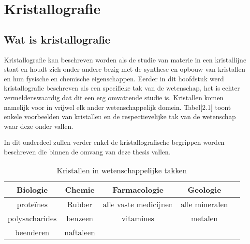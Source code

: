\section{Kristallografie}

\subsection{Wat is kristallografie}
Kristallografie kan beschreven worden als de studie van materie in een kristallijne staat en houdt zich onder andere bezig met de synthese en opbouw van kristallen en hun fysische en chemische eigenschappen. Eerder in dit hoofdstuk werd kristallografie beschreven als een specifieke tak van de wetenschap, het is echter vermeldenswaardig dat dit een erg omvattende studie is. Kristallen komen namelijk voor in vrijwel elk ander wetenschappelijk domein. Tabel[2.1] toont enkele voorbeelden van kristallen en de respectievelijke tak van de wetenschap waar deze onder vallen.
\par
In dit onderdeel zullen verder enkel de kristallografische begrippen worden beschreven die binnen de omvang van deze thesis vallen.  
\par
\begin{table}
\begin{tabular}{@{}ccccl@{}}
\toprule
\multicolumn{1}{c}{\textbf{Biologie}} & \multicolumn{1}{c}{\textbf{Chemie}} & \multicolumn{1}{c}{\textbf{Farmacologie}} & \multicolumn{1}{c}{\textbf{Geologie}} &  \\ \midrule
proteïnes                              & Rubber                               & alle vaste medicijnen                      & alle mineralen                         &  \\
polysacharides                         & benzeen                              & vitamines                                  & metalen                                &  \\
beenderen                              & naftaleen                            &                                            &                                        &  \\ \bottomrule
\end{tabular}
\caption{Kristallen in wetenschappelijke takken}
\end{table}

